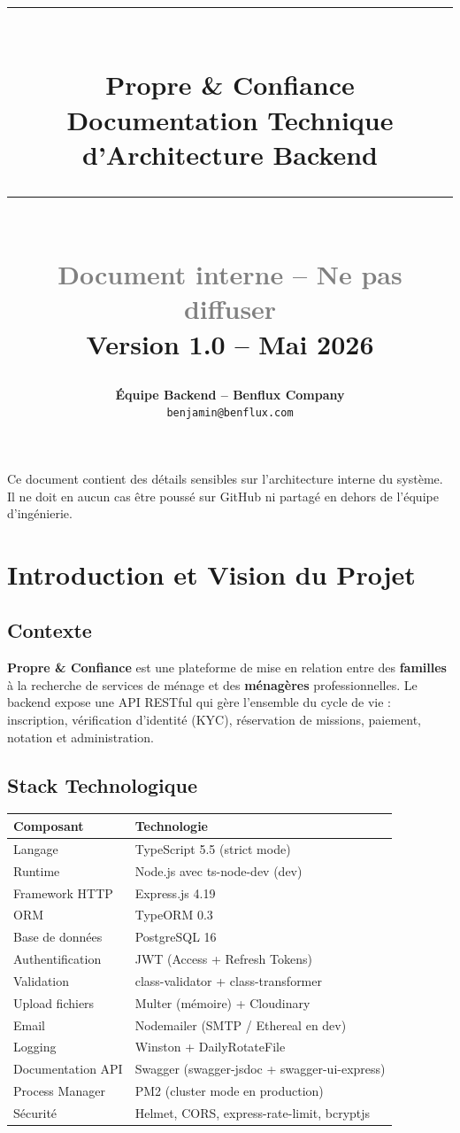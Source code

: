 \documentclass[12pt,a4paper]{report}
\title{
  \vspace{-2cm}
  \textcolor{primary}{\rule{\linewidth}{2pt}}\\[0.5cm]
  {\Huge\textbf{\textcolor{primary}{Propre \& Confiance}}}\\[0.3cm]
  {\LARGE\textcolor{primary!70}{Documentation Technique d'Architecture Backend}}\\[0.5cm]
  \textcolor{primary}{\rule{\linewidth}{2pt}}\\[1.5cm]
  {\large\textcolor{gray}{Document interne -- Ne pas diffuser}}\\[0.3cm]
  {\normalsize Version 1.0 -- Mai 2026}
}
\author{
  \textbf{Équipe Backend -- Benflux Company}\\
  \texttt{benjamin@benflux.com}
}
\date{}
\begin{document}
\maketitle
\thispagestyle{empty}

\begin{warnbox}
Ce document contient des détails sensibles sur l'architecture interne du système. Il ne doit en aucun cas être poussé sur GitHub ni partagé en dehors de l'équipe d'ingénierie.
\end{warnbox}

\clearpage
\tableofcontents
\clearpage

\chapter{Introduction et Vision du Projet}

\section{Contexte}
\textbf{Propre \& Confiance} est une plateforme de mise en relation entre des \textbf{familles} à la recherche de services de ménage et des \textbf{ménagères} professionnelles. Le backend expose une API RESTful qui gère l'ensemble du cycle de vie : inscription, vérification d'identité (KYC), réservation de missions, paiement, notation et administration.

\section{Stack Technologique}
\begin{longtable}{@{}p{4cm}p{9cm}@{}}
\toprule
\textbf{Composant} & \textbf{Technologie} \\
\midrule
Langage & TypeScript 5.5 (strict mode) \\
Runtime & Node.js avec ts-node-dev (dev) \\
Framework HTTP & Express.js 4.19 \\
ORM & TypeORM 0.3 \\
Base de données & PostgreSQL 16 \\
Authentification & JWT (Access + Refresh Tokens) \\
Validation & class-validator + class-transformer \\
Upload fichiers & Multer (mémoire) + Cloudinary \\
Email & Nodemailer (SMTP / Ethereal en dev) \\
Logging & Winston + DailyRotateFile \\
Documentation API & Swagger (swagger-jsdoc + swagger-ui-express) \\
Process Manager & PM2 (cluster mode en production) \\
Sécurité & Helmet, CORS, express-rate-limit, bcryptjs \\
\bottomrule
\end{longtable}
\end{document}
